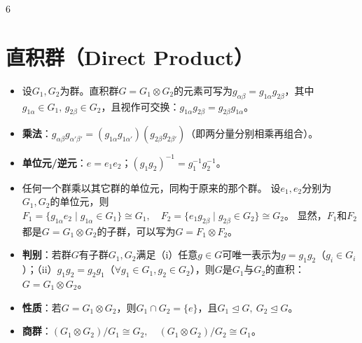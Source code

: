 \documentclass[landscape]{article}
\begin{document}
\begin{multicols*}{6}
\section*{直积群（Direct Product）}
\begin{itemize}
  \item 设$G_1,G_2$为群。直积群$G=G_1\otimes G_2$的元素可写为$g_{\alpha\beta}=g_{1\alpha}g_{2\beta}$，其中$g_{1\alpha}\in G_1,\,g_{2\beta}\in G_2$，且视作可交换：$g_{1\alpha}g_{2\beta}=g_{2\beta}g_{1\alpha}$。
  \item \textbf{乘法}：$g_{\alpha\beta}g_{\alpha'\beta'}=(g_{1\alpha}g_{1\alpha'})(g_{2\beta}g_{2\beta'})$（即两分量分别相乘再组合）。
  \item \textbf{单位元/逆元}：$e=e_1e_2$；$(g_{1}g_{2})^{-1}=g_1^{-1}g_2^{-1}$。
  \item 任何一个群乘以其它群的单位元，同构于原来的那个群。
  设$e_1,e_2$分别为$G_1,G_2$的单位元，则
  $
    F_1 = \{ g_{1\alpha} e_2 \mid g_{1\alpha} \in G_1 \} \cong G_1,\quad
    F_2 = \{ e_1 g_{2\beta} \mid g_{2\beta} \in G_2 \} \cong G_2
  $。
  显然，$F_1$和$F_2$都是$G = G_1 \otimes G_2$的子群，可以写为$G = F_1 \otimes F_2$。
  \item \textbf{判别}：若群$G$有子群$G_1,G_2$满足（i）任意$g\in G$可唯一表示为$g=g_1g_2$（$g_i\in G_i$）；（ii）$g_1g_2=g_2g_1$（$\forall g_1\in G_1,g_2\in G_2$），则$G$是$G_1$与$G_2$的直积：$G=G_1\otimes G_2$。
  \item \textbf{性质}：若$G=G_1\otimes G_2$，则$G_1\cap G_2=\{e\}$，且$G_1\trianglelefteq G,\ G_2\trianglelefteq G$。
  \item \textbf{商群}：$(G_1\otimes G_2)/G_1\cong G_2,\quad (G_1\otimes G_2)/G_2\cong G_1$。
\end{itemize}


\end{multicols*}
\end{document}
